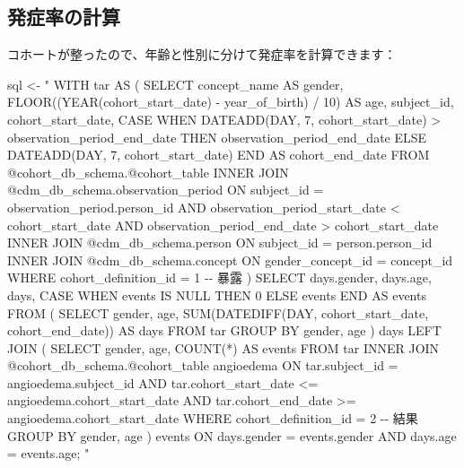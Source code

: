 \documentclass[
  11pt]{book}
\newenvironment{Shaded}{\begin{snugshade}}{\end{snugshade}}
\newcommand{\NormalTok}[1]{#1}
\newcommand{\OtherTok}[1]{\textcolor[rgb]{0.56,0.35,0.01}{#1}}
\newcommand{\StringTok}[1]{\textcolor[rgb]{0.31,0.60,0.02}{#1}}
\theoremstyle{definition}
\theoremstyle{definition}
\theoremstyle{definition}
\theoremstyle{definition}
\theoremstyle{remark}
\begin{document}
\subsection{発症率の計算}\label{ux767aux75c7ux7387ux306eux8a08ux7b97}

コホートが整ったので、年齢と性別に分けて発症率を計算できます：

\begin{Shaded}
\begin{Highlighting}[]
\NormalTok{sql }\OtherTok{\textless{}{-}} \StringTok{"}
\StringTok{WITH tar AS (}
\StringTok{  SELECT concept\_name AS gender,}
\StringTok{    FLOOR((YEAR(cohort\_start\_date) {-}}
\StringTok{          year\_of\_birth) / 10) AS age,}
\StringTok{    subject\_id,}
\StringTok{    cohort\_start\_date,}
\StringTok{    CASE WHEN DATEADD(DAY, 7, cohort\_start\_date) \textgreater{}}
\StringTok{      observation\_period\_end\_date}
\StringTok{    THEN observation\_period\_end\_date}
\StringTok{    ELSE DATEADD(DAY, 7, cohort\_start\_date)}
\StringTok{    END AS cohort\_end\_date}
\StringTok{  FROM @cohort\_db\_schema.@cohort\_table}
\StringTok{  INNER JOIN @cdm\_db\_schema.observation\_period}
\StringTok{    ON subject\_id = observation\_period.person\_id}
\StringTok{      AND observation\_period\_start\_date \textless{} cohort\_start\_date}
\StringTok{      AND observation\_period\_end\_date \textgreater{} cohort\_start\_date}
\StringTok{  INNER JOIN @cdm\_db\_schema.person}
\StringTok{    ON subject\_id = person.person\_id}
\StringTok{  INNER JOIN @cdm\_db\_schema.concept}
\StringTok{    ON gender\_concept\_id = concept\_id}
\StringTok{  WHERE cohort\_definition\_id = 1 {-}{-} 暴露}
\StringTok{)}
\StringTok{SELECT days.gender,}
\StringTok{    days.age,}
\StringTok{    days,}
\StringTok{    CASE WHEN events IS NULL THEN 0 ELSE events END AS events}
\StringTok{FROM (}
\StringTok{  SELECT gender,}
\StringTok{    age,}
\StringTok{    SUM(DATEDIFF(DAY, cohort\_start\_date,}
\StringTok{      cohort\_end\_date)) AS days}
\StringTok{  FROM tar}
\StringTok{  GROUP BY gender,}
\StringTok{    age}
\StringTok{) days}
\StringTok{LEFT JOIN (}
\StringTok{  SELECT gender,}
\StringTok{      age,}
\StringTok{      COUNT(*) AS events}
\StringTok{  FROM tar}
\StringTok{  INNER JOIN @cohort\_db\_schema.@cohort\_table angioedema}
\StringTok{    ON tar.subject\_id = angioedema.subject\_id}
\StringTok{      AND tar.cohort\_start\_date \textless{}= angioedema.cohort\_start\_date}
\StringTok{      AND tar.cohort\_end\_date \textgreater{}= angioedema.cohort\_start\_date}
\StringTok{  WHERE cohort\_definition\_id = 2 {-}{-} 結果}
\StringTok{  GROUP BY gender,}
\StringTok{    age}
\StringTok{) events}
\StringTok{ON days.gender = events.gender}
\StringTok{  AND days.age = events.age;}
\StringTok{"}


\end{Highlighting}
\end{Shaded}
\end{document}
